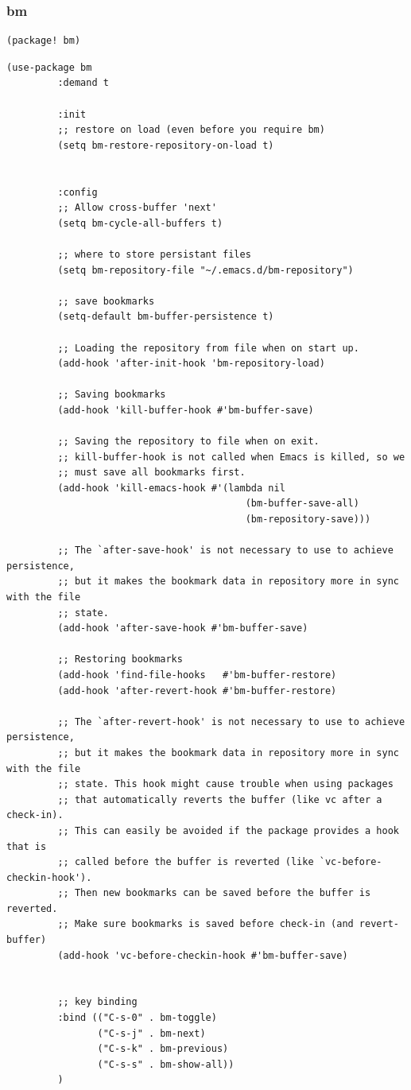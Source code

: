 \documentclass[11pt]{article}
\begin{document}
\subsubsection{bm}
\label{sec:orga6245f1}
\begin{verbatim}
(package! bm)
\end{verbatim}

\begin{verbatim}
(use-package bm
         :demand t

         :init
         ;; restore on load (even before you require bm)
         (setq bm-restore-repository-on-load t)


         :config
         ;; Allow cross-buffer 'next'
         (setq bm-cycle-all-buffers t)

         ;; where to store persistant files
         (setq bm-repository-file "~/.emacs.d/bm-repository")

         ;; save bookmarks
         (setq-default bm-buffer-persistence t)

         ;; Loading the repository from file when on start up.
         (add-hook 'after-init-hook 'bm-repository-load)

         ;; Saving bookmarks
         (add-hook 'kill-buffer-hook #'bm-buffer-save)

         ;; Saving the repository to file when on exit.
         ;; kill-buffer-hook is not called when Emacs is killed, so we
         ;; must save all bookmarks first.
         (add-hook 'kill-emacs-hook #'(lambda nil
                                          (bm-buffer-save-all)
                                          (bm-repository-save)))

         ;; The `after-save-hook' is not necessary to use to achieve persistence,
         ;; but it makes the bookmark data in repository more in sync with the file
         ;; state.
         (add-hook 'after-save-hook #'bm-buffer-save)

         ;; Restoring bookmarks
         (add-hook 'find-file-hooks   #'bm-buffer-restore)
         (add-hook 'after-revert-hook #'bm-buffer-restore)

         ;; The `after-revert-hook' is not necessary to use to achieve persistence,
         ;; but it makes the bookmark data in repository more in sync with the file
         ;; state. This hook might cause trouble when using packages
         ;; that automatically reverts the buffer (like vc after a check-in).
         ;; This can easily be avoided if the package provides a hook that is
         ;; called before the buffer is reverted (like `vc-before-checkin-hook').
         ;; Then new bookmarks can be saved before the buffer is reverted.
         ;; Make sure bookmarks is saved before check-in (and revert-buffer)
         (add-hook 'vc-before-checkin-hook #'bm-buffer-save)


         ;; key binding
         :bind (("C-s-0" . bm-toggle)
                ("C-s-j" . bm-next)
                ("C-s-k" . bm-previous)
                ("C-s-s" . bm-show-all))
         )
\end{verbatim}
\end{document}
